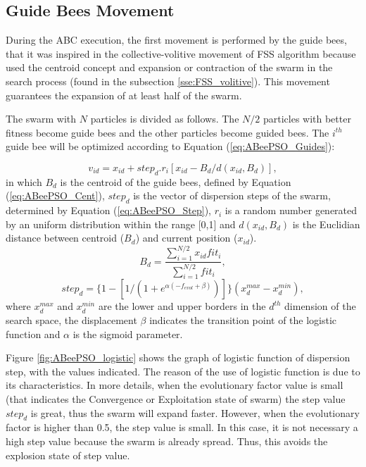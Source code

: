 \subsection{Guide Bees Movement}
During the ABC execution, the first movement is performed by the guide bees, that it was inspired in the collective-volitive movement of FSS algorithm because used the centroid concept and expansion or contraction of the swarm in the search process (found in the subsection \ref{sse:FSS_volitive}). This movement guarantees the expansion of at least half of the swarm.

The swarm with $N$ particles is divided as follows. The $N/2$ particles with better fitness become guide bees and the other particles become guided bees. The $i^{th}$ guide bee will be optimized according to Equation (\ref{eq:ABeePSO_Guides}):

\begin{equation}\label{eq:ABeePSO_Guides}
{v}_{id} = {x}_{id} + step_d.{r}_{i}[{x}_{id} - B_d/d({x}_{id}, B_d)],
\end{equation}
 in which $B_d$ is the centroid of the guide bees, defined by Equation (\ref{eq:ABeePSO_Cent}), $step_d$ is the vector of dispersion steps of the swarm, determined by Equation (\ref{eq:ABeePSO_Step}), ${r}_{i}$ is a random number generated by an uniform distribution within the range [0,1] and $d(x_{id}, B_d)$ is the Euclidian distance between centroid ($B_d$) and current position ($x_{id}$).
\begin{equation}\label{eq:ABeePSO_Cent}
B_d = \frac{\sum^{N/2}_{i=1} x_{id}fit_{i}}{\sum^{N/2}_{i=1} fit_{i}},
\end{equation}
\begin{equation}\label{eq:ABeePSO_Step}
step_d = \{1-[1/(1+e^{\alpha(-f_{evol} + \beta)})]\}(x_d^{max} - x_d^{min}),
\end{equation}
where $x_d^{max}$ and $x_d^{min}$ are the lower and upper borders in the $d^{th}$ dimension of the search space, the displacement $\beta$ indicates the transition point of the logistic function and $\alpha$ is the sigmoid parameter.

Figure \ref{fig:ABeePSO_logistic} shows the graph of logistic function of dispersion step, with the values indicated. The reason of the use of logistic function is due to its characteristics. In more details, when the evolutionary factor value is small (that indicates the Convergence or Exploitation state of swarm) the step value $step_d$ is great, thus the swarm will expand faster. However, when the evolutionary factor is higher than 0.5, the step value is small. In this case, it is not necessary a high step value because the swarm is already spread. Thus, this avoids the explosion state of step value.

